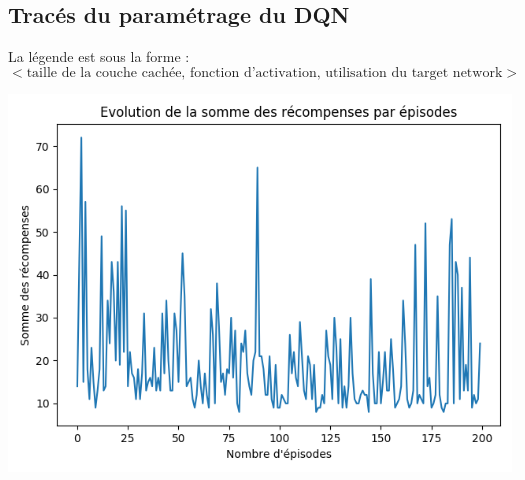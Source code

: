 \documentclass[10pt,a4paper]{article}
\begin{document}
\subsection{Tracés du paramétrage du DQN} \label{graphDQN}

La légende est sous la forme :
$$ < \text{taille de la couche cachée, fonction d'activation, utilisation du target network} >$$

\begin{center}
	\includegraphics[scale=0.3]{tarnetRelu24.png}
\end{center}
\end{document}
